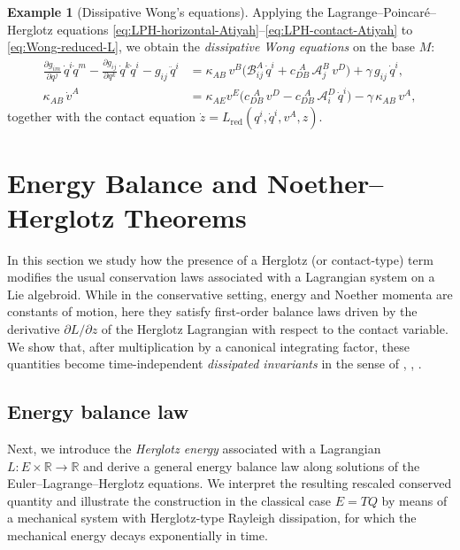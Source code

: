 \documentclass[11pt,a4paper]{article}
\theoremstyle{definition}
\newtheorem{example}[theorem]{Example}
\begin{document}
\begin{example}[Dissipative Wong's equations]
Applying the Lagrange--Poincar\'e--Herglotz equations
\eqref{eq:LPH-horizontal-Atiyah}--\eqref{eq:LPH-contact-Atiyah} to
\eqref{eq:Wong-reduced-L}, we obtain the \emph{dissipative Wong equations}
on the base $M$:
\begin{align}
\frac{\partial g_{im}}{\partial q^{j}}\,\dot q^{i}\dot q^{m}
 - \frac{\partial g_{ij}}{\partial q^{k}}\,\dot q^{k}\dot q^{i}
 - g_{ij}\,\ddot q^{i}
&=
\kappa_{AB}\,v^{B}
\Big(\mathcal{B}_{ij}^{A}\,\dot q^{i}
 + c_{DB}^{\ \ A}\,\mathcal{A}_{j}^{B}\,v^{D}\Big)
 + \gamma\,g_{ij}\,\dot q^{i},
\label{eq:Wong-dissipative-horizontal}
\\[0.3em]
\kappa_{AB}\,\dot v^{A}
&=
\kappa_{AE}v^{E}
\Big(
c_{DB}^{\ \ A}\,v^{D}
 - c_{DB}^{\ \ A}\,\mathcal{A}_{i}^{D}\,\dot q^{i}
\Big)
 - \gamma\,\kappa_{AB}\,v^{A},
\label{eq:Wong-dissipative-vertical}
\end{align}
together with the contact equation $\dot z = L_{\mathrm{red}}(q^i,\dot q^i,v^A,z)$.

\end{example}




\section{Energy Balance and Noether--Herglotz Theorems}\label{section5}

In this section we study how the presence of a Herglotz (or contact-type)
term modifies the usual conservation laws associated with a Lagrangian
system on a Lie algebroid.  
While in the conservative setting, energy and Noether momenta are
constants of motion, here they satisfy first-order balance laws driven by
the derivative $\partial L/\partial z$ of the Herglotz Lagrangian with
respect to the contact variable.  We show that, after multiplication by a
canonical integrating factor, these quantities become time-independent
\emph{dissipated invariants} in the sense of \cite{bravetti2017contact}, \cite{gaset2020new}, \cite{de2021symmetries}.


\subsection{Energy balance law}

Next, we introduce the \emph{Herglotz energy}
associated with a Lagrangian $L\colon E\times\mathbb{R}\to\mathbb{R}$
and derive a general energy balance law along solutions of the
Euler--Lagrange--Herglotz equations.
We interpret the resulting rescaled conserved quantity and illustrate the
construction in the classical case $E=TQ$ by means of a mechanical
system with Herglotz-type Rayleigh dissipation, for which the mechanical
energy decays exponentially in time.
\end{document}
